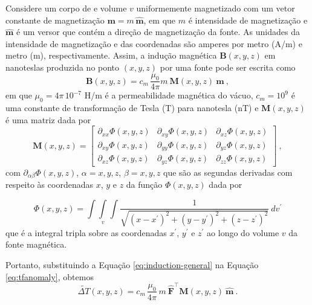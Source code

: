 Considere um corpo de e volume $v$ uniformemente magnetizado com um vetor constante de magnetização $\mathbf{m} = m \, \hat{\mathbf{m}}$, em que $ m $ é intensidade de magnetização e $ \hat{\mathbf{m}} $ é um versor que contém a direção de magnetização da fonte. 
As unidades da intensidade de magnetização e das coordenadas são amperes por metro (A/m) e metro (m), respectivamente. 
Assim, a indução magnética $\mathbf{B}(x, y, z)$ em nanoteslas produzida no ponto $(x, y, z)$ por uma fonte pode ser escrita como
\begin{equation}
\mathbf{B}(x, y, z) = c_{m} \, \frac{\mu_{0}}{4\pi}m \: \mathbf{M}(x, y, z) \: 
\hat{\mathbf{m}} \: ,
\label{eq:induction-general}
\end{equation}
em que $\mu_{0} = 4\pi \, 10^{-7}$ H/m é a permeabilidade magnética do vácuo, 
$c_{m} = 10^{9}$ é uma constante de transformação de Tesla (T) para nanotesla (nT) e $\mathbf{M}(x, y, z)$ é uma matriz dada por
\begin{equation}
\mathbf{M}(x, y, z) =
\left[
\begin{array}{ccc}
\partial_{xx} \Phi(x, y, z) & \partial_{xy} \Phi(x, y, z) & 
\partial_{xz} \Phi(x, y, z) \\
\partial_{xy} \Phi(x, y, z) & \partial_{yy} \Phi(x, y, z) & 
\partial_{yz} \Phi(x, y, z) \\
\partial_{xz} \Phi(x, y, z) & \partial_{yz} \Phi(x, y, z) & 
\partial_{zz} \Phi(x, y, z)
\end{array}
\right] \: ,
\label{eq:M}
\end{equation}
com $\partial_{\alpha\beta} \Phi(x, y, z)$, $\alpha = x, y, z$, 
$\beta = x, y, z$ que são as segundas derivadas com respeito às coordenadas $x$, $y$ e $z$ da função $\Phi(x,y,z)$ dada por

\begin{equation}
\Phi(x,y,z) = \int\int\limits_{v}\int \frac{1}{\sqrt{(x - x^{\prime})^{2} + 
		(y - y^{\prime})^{2} + (z - z^{\prime})^{2}}} \: dv^{\prime}
\label{eq:phi}
\end{equation}
que é a integral tripla sobre as coordenadas $x^{\prime}$, $y^{\prime}$ 
e $z^{\prime}$ ao longo do volume $v$ da fonte magnética.

Portanto, substituindo a Equação \ref{eq:induction-general} na Equação \ref{eq:tfanomaly}, obtemos
\begin{equation}
\tilde{\Delta T}(x, y, z) = c_{m} \, \frac{\mu_{0}}{4\pi} \, m \: \hat{\mathbf{F}}^{\top} 
\mathbf{M}(x, y, z) \: \hat{\mathbf{m}} \: .
\label{eq:tfanomaly-general}
\end{equation}


